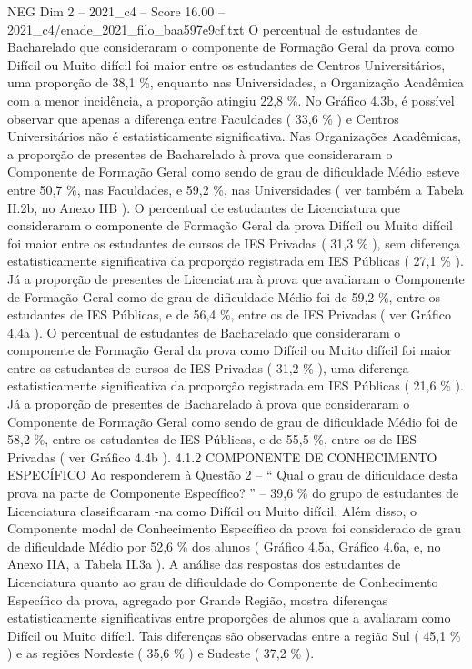\begin{textsample}{NEG Dim 2 – 2021\_c4 – Score 16.00 – 2021\_c4/enade\_2021\_filo\_baa597e9cf.txt}
O percentual de estudantes de Bacharelado que consideraram o componente de Formação Geral da prova como Difícil ou Muito difícil foi maior entre os estudantes de Centros Universitários, uma proporção de 38,1 \%, enquanto nas Universidades, a Organização Acadêmica com a menor incidência, a proporção atingiu 22,8 \%.
No Gráfico 4.3b, é possível observar que apenas a diferença entre Faculdades ( 33,6 \% ) e Centros Universitários não é estatisticamente significativa.
Nas Organizações Acadêmicas, a proporção de presentes de Bacharelado à prova que consideraram o Componente de Formação Geral como sendo de grau de dificuldade Médio esteve entre 50,7 \%, nas Faculdades, e 59,2 \%, nas Universidades ( ver também a Tabela II.2b, no Anexo IIB ).
O percentual de estudantes de Licenciatura que consideraram o componente de Formação Geral da prova Difícil ou Muito difícil foi maior entre os estudantes de cursos de IES Privadas ( 31,3 \% ), sem diferença estatisticamente significativa da proporção registrada em IES Públicas ( 27,1 \% ).
Já a proporção de presentes de Licenciatura à prova que avaliaram o Componente de Formação Geral como de grau de dificuldade Médio foi de 59,2 \%, entre os estudantes de IES Públicas, e de 56,4 \%, entre os de IES Privadas ( ver Gráfico 4.4a ).
O percentual de estudantes de Bacharelado que consideraram o componente de Formação Geral da prova como Difícil ou Muito difícil foi maior entre os estudantes de cursos de IES Privadas ( 31,2 \% ), uma diferença estatisticamente significativa da proporção registrada em IES Públicas ( 21,6 \% ).
Já a proporção de presentes de Bacharelado à prova que consideraram o Componente de Formação Geral como sendo de grau de dificuldade Médio foi de 58,2 \%, entre os estudantes de IES Públicas, e de 55,5 \%, entre os de IES Privadas ( ver Gráfico 4.4b ). 4.1.2 COMPONENTE DE CONHECIMENTO ESPECÍFICO Ao responderem à Questão 2 – “ Qual o grau de dificuldade desta prova na parte de Componente Específico? ” – 39,6 \% do grupo de estudantes de Licenciatura classificaram -na como Difícil ou Muito difícil.
Além disso, o Componente modal de Conhecimento Específico da prova foi considerado de grau de dificuldade Médio por 52,6 \% dos alunos ( Gráfico 4.5a, Gráfico 4.6a, e, no Anexo IIA, a Tabela II.3a ).
A análise das respostas dos estudantes de Licenciatura quanto ao grau de dificuldade do Componente de Conhecimento Específico da prova, agregado por Grande Região, mostra diferenças estatisticamente significativas entre proporções de alunos que a avaliaram como Difícil ou Muito difícil.
Tais diferenças são observadas entre a região Sul ( 45,1 \% ) e as regiões Nordeste ( 35,6 \% ) e Sudeste ( 37,2 \% ).

\end{textsample}
